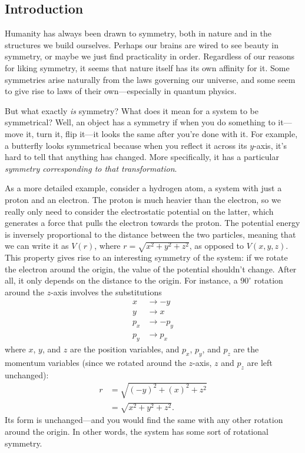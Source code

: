 
\subsection*{Introduction}
Humanity has always been drawn to symmetry, both in nature and in the structures we build ourselves. Perhaps our brains are wired to see beauty in symmetry, or maybe we just find practicality in order. Regardless of our reasons for liking symmetry, it seems that nature itself has its own affinity for it. Some symmetries arise naturally from the laws governing our universe, and some seem to give rise to laws of their own---especially in quantum physics. 

But what exactly \emph{is} symmetry? What does it mean for a system to be symmetrical? Well, an object has a symmetry if when you do something to it---move it, turn it, flip it---it looks the same after you're done with it. For example, a butterfly looks symmetrical because when you reflect it across its $y$-axis, it's hard to tell that anything has changed. More specifically, it has a particular \emph{symmetry corresponding to that transformation}.

As a more detailed example, consider a hydrogen atom, a system with just a proton and an electron. The proton is much heavier than the electron, so we really only need to consider the electrostatic potential on the latter, which generates a force that pulls the electron towards the proton. The potential energy is inversely proportional to the distance between the two particles, meaning that we can write it as $V(r)$, where $r = \sqrt{x^2 + y^2 + z^2}$, as opposed to $V(x, y, z)$. This property gives rise to an interesting symmetry of the system: if we rotate the electron around the origin, the value of the potential shouldn't change. After all, it only depends on the distance to the origin. For instance, a $90^{\circ}$ rotation around the $z$-axis involves the substitutions
\begin{align*}
    x &\rightarrow -y \\
    y &\rightarrow x \\
    p_x &\rightarrow -p_y \\
    p_y &\rightarrow p_x
\end{align*}
where $x$, $y$, and $z$ are the position variables, and $p_x$, $p_y$, and $p_z$ are the momentum variables (since we rotated around the $z$-axis, $z$ and $p_z$ are left unchanged):
\begin{align*}
    r &= \sqrt{(-y)^2 + (x)^2 + z^2} \\
    &= \sqrt{x^2 + y^2 + z^2}.
\end{align*}
Its form is unchanged---and you would find the same with any other rotation around the origin. In other words, the system has some sort of rotational symmetry.


